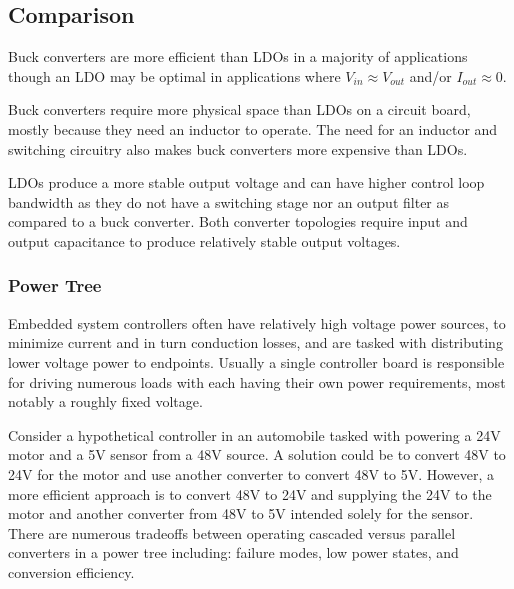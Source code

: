 \documentclass[main.tex]{subfiles}
\begin{document}
\subsection{Comparison}
Buck converters are more efficient than LDOs in a majority of applications though an LDO may be optimal in applications where $V_{in} \approx V_{out}$ and/or $I_{out} \approx 0$. \newline

\newnoindentpara Buck converters require more physical space than LDOs on a circuit board, mostly because they need an inductor to operate. The need for an inductor and switching circuitry also makes buck converters more expensive than LDOs. \newline

\newnoindentpara LDOs produce a more stable output voltage and can have higher control loop bandwidth as they do not have a switching stage nor an output filter as compared to a buck converter. Both converter topologies require input and output capacitance to produce relatively stable output voltages.

\subsubsection{Power Tree}
Embedded system controllers often have relatively high voltage power sources, to minimize current and in turn conduction losses, and are tasked with distributing lower voltage power to endpoints. Usually a single controller board is responsible for driving numerous loads with each having their own power requirements, most notably a roughly fixed voltage. \newline

\newnoindentpara Consider a hypothetical controller in an automobile tasked with powering a 24V motor and a 5V sensor from a 48V source. A solution could be to convert 48V to 24V for the motor and use another converter to convert 48V to 5V. However, a more efficient approach is to convert 48V to 24V and supplying the 24V to the motor and another converter from 48V to 5V intended solely for the sensor. There are numerous tradeoffs between operating cascaded versus parallel converters in a power tree including: failure modes, low power states, and conversion efficiency. %
\end{document}
